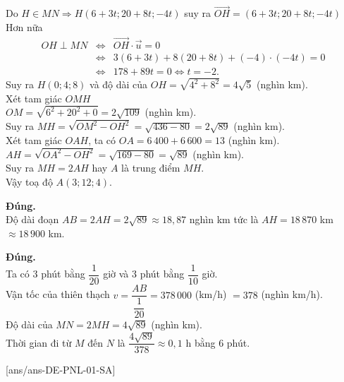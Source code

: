 \begin{ex}
{\begin{itemchoice}
\begin{center}
\begin{tikzpicture}[line join = round, line cap=round,>=stealth,font=\footnotesize,transform shape,scale=0.7]
                \end{tikzpicture}
            \end{center}
            Do $H\in MN\Rightarrow H(6+3t;20+8t;-4t)$ suy ra $\overrightarrow{OH}=(6+3t;20+8t;-4t)$ 
            \\
            Hơn nữa
            \begin{eqnarray*}
                OH\perp MN &\Leftrightarrow& \overrightarrow{OH}\cdot \overrightarrow{u}=0
                \\
                &\Leftrightarrow& 3(6 + 3t) + 8(20 + 8t) + (-4)\cdot (-4t)=0
                \\
                &\Leftrightarrow&178 + 89t=0 \Leftrightarrow t=-2.
            \end{eqnarray*}
            Suy ra $H(0;4;8)$ và độ dài của $OH=\sqrt{4^2+8^2}=4\sqrt 5$ (nghìn km).
            \\
            Xét tam giác $OMH$
            \\ 
            $OM=\sqrt{6^2+20^2+0}=2\sqrt{109}$ (nghìn km).
            \\
            Suy ra $MH=\sqrt{OM^2-OH^2}=\sqrt{436-80}=2\sqrt{89}$ (nghìn km).
            \\
            Xét tam giác $OAH$, ta có $OA=6\,400+6\,600=13$ (nghìn km).
            \\
            $AH=\sqrt{OA^2-OH^2}=\sqrt{169-80}=\sqrt{89}$ (nghìn km).
            \\
            Suy ra $MH=2AH$ hay $A$ là trung điểm $MH$.
            \\
            Vậy toạ độ $A(3;12;4)$.
            
            
            \itemch \textbf{Đúng.}
            \\
            Độ dài đoạn $AB=2AH=2\sqrt{89}\approx 18{,}87$ nghìn km tức là $AH=18\, 870$ km $\approx 18\, 900$ km.
            
            \itemch \textbf{Đúng.}
            \\
            Ta có $3$ phút bằng $\dfrac{1}{20}$ giờ và $3$ phút bằng $\dfrac{1}{10}$ giờ.
            \\
            Vận tốc của thiên thạch $v=\dfrac{AB}{\dfrac{1}{20}}=378\,000$ (km/h) $=378$ (nghìn km/h).
            \\
            Độ dài của $MN=2MH=4\sqrt{89}$ (nghìn km).
            \\
            Thời gian đi từ $M$ đến $N$ là $\dfrac{4\sqrt{89}}{378}\approx 0{,}1$ h bằng $6$ phút.
        \end{itemchoice}
    }
\end{ex}
\TNSA
{}[ans/ans-DE-PNL-01-SA]


